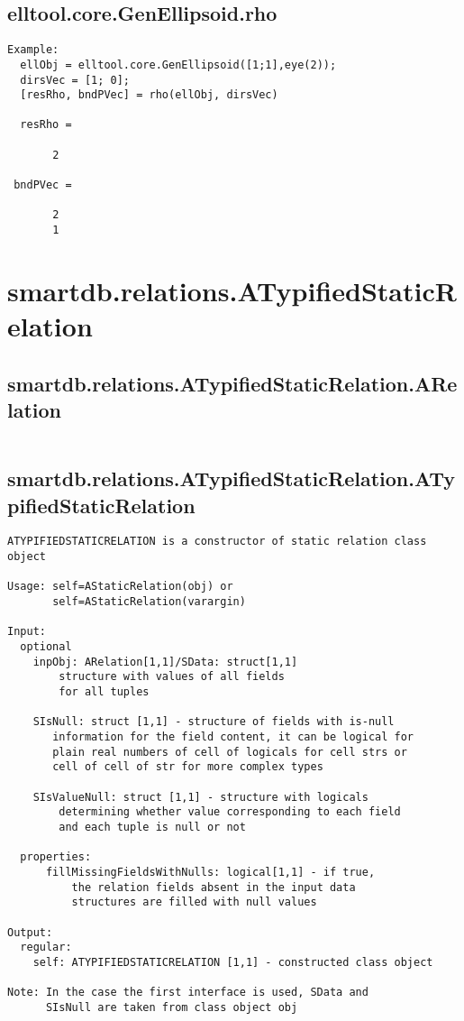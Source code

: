 \subsection{\texorpdfstring{elltool.core.GenEllipsoid.rho}{rho}}\label{method:elltool.core.GenEllipsoid.rho}
\begin{verbatim}
Example:
  ellObj = elltool.core.GenEllipsoid([1;1],eye(2));
  dirsVec = [1; 0];
  [resRho, bndPVec] = rho(ellObj, dirsVec)

  resRho =

       2

 bndPVec =

       2
       1
\end{verbatim}
\section{smartdb.relations.ATypifiedStaticRelation}\label{secClassDescr:smartdb.relations.ATypifiedStaticRelation}
\subsection{\texorpdfstring{smartdb.relations.ATypifiedStaticRelation.ARelation}{ARelation}}\label{method:smartdb.relations.ATypifiedStaticRelation.ARelation}
\begin{verbatim}

\end{verbatim}
\subsection{\texorpdfstring{smartdb.relations.ATypifiedStaticRelation.ATypifiedStaticRelation}{ATypifiedStaticRelation}}\label{method:smartdb.relations.ATypifiedStaticRelation.ATypifiedStaticRelation}
\begin{verbatim}
ATYPIFIEDSTATICRELATION is a constructor of static relation class
object

Usage: self=AStaticRelation(obj) or
       self=AStaticRelation(varargin)

Input:
  optional
    inpObj: ARelation[1,1]/SData: struct[1,1]
        structure with values of all fields
        for all tuples

    SIsNull: struct [1,1] - structure of fields with is-null
       information for the field content, it can be logical for
       plain real numbers of cell of logicals for cell strs or
       cell of cell of str for more complex types

    SIsValueNull: struct [1,1] - structure with logicals
        determining whether value corresponding to each field
        and each tuple is null or not

  properties:
      fillMissingFieldsWithNulls: logical[1,1] - if true,
          the relation fields absent in the input data
          structures are filled with null values

Output:
  regular:
    self: ATYPIFIEDSTATICRELATION [1,1] - constructed class object

Note: In the case the first interface is used, SData and
      SIsNull are taken from class object obj
\end{verbatim}
